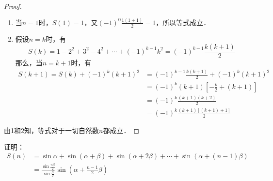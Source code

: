\begin{proof}
\begin{enumerate}
    \item 当$n=1$时，$S(1)=1$，又$(-1)^0\frac{1(1+1)}{2}=1$，所以等式成立．

\item 假设$n=k$时，有
\[S(k)=1-2^2+3^2-4^2+\cdots+(-1)^{k-1}k^2=(-1)^{k-1}\frac{k(k+1)}{2}\]
那么，当$n=k+1$时，有    
\[\begin{split}
    S(k+1)=S(k)+(-1)^k(k+1)^2&=(-1)^{k-1}\frac{k(k+1)}{2}+(-1)^k(k+1)^2\\
    &=(-1)^k(k+1)\left[-\frac{k}{2}+(k+1)\right]\\
    &=(-1)^k \frac{(k+1)(k+2)}{2}\\
    &=(-1)^k \frac{(k+1)[(k+1)+1]}{2}
\end{split}\]
\end{enumerate}

由1和2知，等式对于一切自然数$n$都成立．
\end{proof}


\begin{example}
证明：
\[\begin{split}
    S(n)&= \sin \alpha+\sin (\alpha+\beta)+\sin (\alpha+2 \beta)+\cdots+\sin (\alpha+(n-1) \beta) \\
&= \frac{\sin \frac{n \beta}{2}}{\sin \frac{\beta}{2}} \sin \left(\alpha+\frac{n-1}{2} \beta\right)
\end{split}\]
\end{example}

